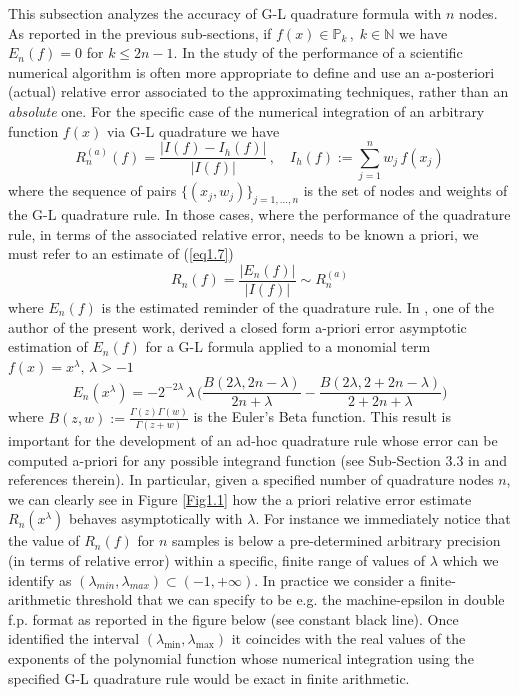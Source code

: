 \documentclass[a4paper, twosided]{book}
\begin{document}
This subsection analyzes the accuracy of G-L quadrature formula with $n$ nodes. As reported in the previous sub-sections,  if $f(x)\in\mathbb{P}_k\,,\;k\in\mathbb{N}$ we have $E_n(f)=0$ for $k\leq2n-1$.  
In the study of the performance of a scientific numerical algorithm  is often more appropriate to define and use an a-posteriori (actual) relative error associated to the approximating techniques, rather than an {\itshape absolute} one. For the specific case of the numerical integration of an arbitrary function $f(x)$ via G-L quadrature we have
\begin{equation}\label{eq1.7}
    R_n^{(a)}(f) = \frac{|I(f)-I_h(f)|}{|I(f)|}\,,\quad I_h(f):=\sum_{j=1}^{n}w_j\,f(x_j)
\end{equation}
\noindent
where the sequence of pairs $\{(x_j,w_j)\}_{j=1,...,n}$ is the set of nodes and weights of the G-L quadrature rule. In those cases, where the performance of the quadrature rule, in terms of the associated relative error, needs to be known a priori, we must refer to an estimate of (\ref{eq1.7}) 
\begin{equation}\label{eq1.8}
    R_n(f) = \frac{|E_n(f)|}{|I(f)|} \sim R_n^{(a)}
\end{equation}
where $E_n(f)$ is the estimated reminder of the quadrature rule. In \cite{Lombardi09}, one of the author of the present work, derived a closed form a-priori error asymptotic estimation of $E_n(f)$ for a G-L formula applied to a monomial term $f(x)=x^\lambda,\, \lambda>-1$
\begin{equation}\label{eq1.9}
    E_n(x^\lambda) = -2^{-2\lambda}\,\lambda\,\bigg(\frac{B(2\lambda,2n-\lambda)}{2n+\lambda} - \frac{B(2\lambda, 2+2n-\lambda)}{2+2n+\lambda}\bigg)
\end{equation}
\noindent
where $B(z,w):=\frac{\Gamma(z)\Gamma(w)}{\Gamma(z+w)}$ is the Euler's Beta function. This result is important for the development of an ad-hoc quadrature rule whose error can be computed a-priori for any possible integrand function (see Sub-Section 3.3 in \cite{Lombardi21} and references therein). In particular, given a specified number of quadrature nodes $n$, we can clearly see in Figure \ref{Fig1.1} how the a priori relative error estimate $R_n(x^\lambda)$ behaves asymptotically with $\lambda$. For instance we immediately notice that the value of $R_n(f)$ for $n$ samples is below a pre-determined arbitrary precision (in terms of relative error) within a specific, finite range of values of $\lambda$ which we identify as $(\lambda_{min},\lambda_{max})\subset(-1,+\infty)$. In practice we consider a finite-arithmetic threshold that we can specify to be e.g. the machine-epsilon in double f.p. format as reported in the figure below (see constant black line). Once identified the interval $(\lambda_{\text{min}}, \lambda_{\text{max}})$ it coincides with the real values of the exponents of the polynomial function whose numerical integration using the specified G-L quadrature rule would be exact in finite arithmetic.
\end{document}
